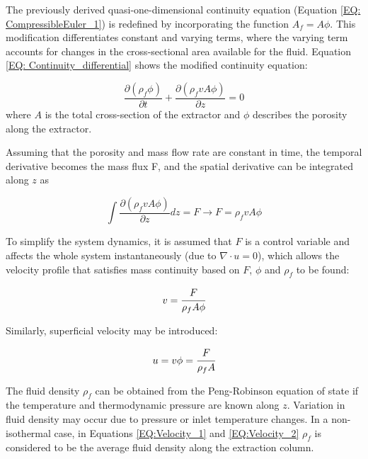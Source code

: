 \documentclass[a4paper,fleqn]{cas-dc}
\begin{document}
The previously derived quasi-one-dimensional continuity equation (Equation \ref{EQ: CompressibleEuler_1}) is redefined by incorporating the function $A_f = A\phi$. This modification differentiates constant and varying terms, where the varying term accounts for changes in the cross-sectional area available for the fluid. Equation \ref{EQ: Continuity_differential} shows the modified continuity equation:

{\footnotesize
	\begin{equation} \label{EQ: Continuity_differential}
		\frac{\partial (\rho_f \phi)}{\partial t} + \frac{\partial (\rho_f v A\phi)}{\partial z} = 0
	\end{equation}
}
where $A$ is the total cross-section of the extractor and $\phi$ describes the porosity along the extractor.

Assuming that the porosity and mass flow rate are constant in time, the temporal derivative becomes the mass flux F, and the spatial derivative can be integrated along $z$ as

{\footnotesize
	\begin{equation}
		\int \frac{\partial (\rho_f v A \phi )}{\partial z} dz = F \rightarrow F=\rho_f v A\phi
	\end{equation}
}

To simplify the system dynamics, it is assumed that $F$ is a control variable and affects the whole system instantaneously (due to $\nabla \cdot u = 0$), which allows the velocity profile that satisfies mass continuity based on $F$, $\phi$ and $\rho_f$ to be found:

{\footnotesize
	\begin{equation} \label{EQ:Velocity_1}
		v = \cfrac{F}{\rho_f A\phi} 
	\end{equation}
}

Similarly, superficial velocity may be introduced:

{\footnotesize
	\begin{equation} \label{EQ:Velocity_2}
		u = v \phi = \cfrac{F}{\rho_f A }
	\end{equation}
}

The fluid density $\rho_f$ can be obtained from the Peng-Robinson equation of state if the temperature and thermodynamic pressure are known along $z$. Variation in fluid density may occur due to pressure or inlet temperature changes. In a non-isothermal case, in Equations \ref{EQ:Velocity_1} and \ref{EQ:Velocity_2} $\rho_f$ is considered to be the average fluid density along the extraction column.
\end{document}
